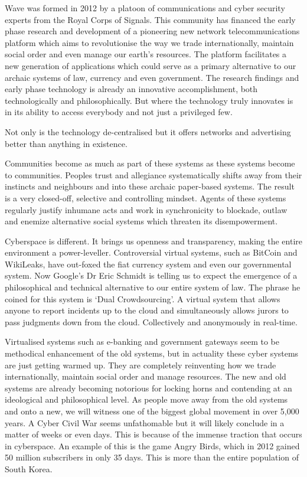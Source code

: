 \documentclass[letterpaper,10pt,openany,oneside,english]{sphinxmanual}
\begin{document}
Wave was formed in 2012 by a platoon of communications and cyber security experts from the
Royal Corps of Signals. This community has financed the early phase research and development
of a pioneering new network telecommunications platform which aims to revolutionise the way
we trade internationally, maintain social order and even manage our earth’s resources.
The platform facilitates a new generation of applications which could serve as a primary
alternative to our archaic systems of law, currency and even government. The research findings
and early phase technology is already an innovative accomplishment, both technologically and
philosophically. But where the technology truly innovates is in its ability to access everybody and
not just a privileged few.

Not only is the technology de-centralised but it offers networks and advertising better than
anything in existence.


Communities become as much as part of these systems as these systems become to
communities. Peoples trust and allegiance systematically shifts away from their instincts and
neighbours and into these archaic paper-based systems. The result is a very closed-off, selective
and controlling mindset. Agents of these systems regularly justify inhumane acts and work in
synchronicity to blockade, outlaw and enemize alternative social systems which threaten its
disempowerment.

Cyberspace is different. It brings us openness and transparency, making the entire environment
a power-leveller. Controversial virtual systems, such as BitCoin and WikiLeaks, have out-foxed
the fiat currency system and even our governmental system. Now Google’s Dr Eric Schmidt is
telling us to expect the emergence of a philosophical and technical alternative to our entire
system of law. The phrase he coined for this system is ‘Dual Crowdsourcing’. A virtual system
that allows anyone to report incidents up to the cloud and simultaneously allows jurors to pass
judgments down from the cloud. Collectively and anonymously in real-time.

Virtualised systems such as e-banking and government gateways seem to be methodical
enhancement of the old systems, but in actuality these cyber systems are just getting warmed
up. They are completely reinventing how we trade internationally, maintain social order and
manage resources. The new and old systems are already becoming notorious for locking horns
and contending at an ideological and philosophical level. As people move away from the old
systems and onto a new, we will witness one of the biggest global movement in over 5,000
years. A Cyber Civil War seems unfathomable but it will likely conclude in a matter of weeks or
even days. This is because of the immense traction that occurs in cyberspace. An example of this
is the game Angry Birds, which in 2012 gained 50 million subscribers in only 35 days. This is
more than the entire population of South Korea.
\end{document}
